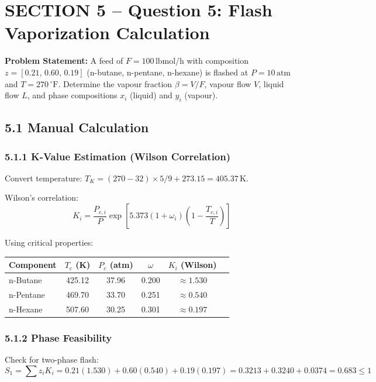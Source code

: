 \documentclass[12pt,a4paper]{article}
\begin{document}
\section{SECTION 5 -- Question 5: Flash Vaporization Calculation}

\textbf{Problem Statement:} A feed of $F = 100\,\text{lbmol/h}$ with composition
$z = [0.21,\,0.60,\,0.19]$ (n-butane, n-pentane, n-hexane) is flashed at $P = 10\,\text{atm}$
and $T = 270\,^{\circ}\text{F}$. Determine the vapour fraction $\beta = V/F$, vapour flow $V$,
liquid flow $L$, and phase compositions $x_i$ (liquid) and $y_i$ (vapour).

\subsection{5.1 Manual Calculation}

\subsubsection{5.1.1 K-Value Estimation (Wilson Correlation)}

Convert temperature: $T_K = (270 - 32)\times 5/9 + 273.15 = 405.37\,\text{K}$.

Wilson's correlation:
\[
K_i = \frac{P_{c,i}}{P}\exp\!\left[5.373(1+\omega_i)\left(1 - \frac{T_{c,i}}{T}\right)\right]
\]

Using critical properties:

\begin{center}
\begin{tabular}{lccccc}
  \toprule
  \textbf{Component} & $T_c$ (K) & $P_c$ (atm) & $\omega$ & \textbf{$K_i$ (Wilson)} \\
  \midrule
  n-Butane   & 425.12 & 37.96 & 0.200 & $\approx 1.530$ \\
  n-Pentane  & 469.70 & 33.70 & 0.251 & $\approx 0.540$ \\
  n-Hexane   & 507.60 & 30.25 & 0.301 & $\approx 0.197$ \\
  \bottomrule
\end{tabular}
\end{center}

\subsubsection{5.1.2 Phase Feasibility}

Check for two-phase flash:
\[
S_1 = \sum z_i K_i = 0.21(1.530) + 0.60(0.540) + 0.19(0.197) = 0.3213 + 0.3240 + 0.0374 = 0.683 \le 1
\]
\end{document}
